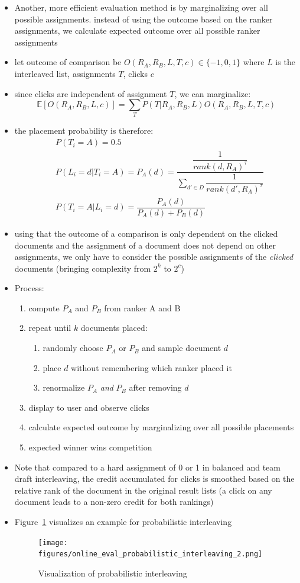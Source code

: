 \begin{itemize}
	\item Another, more efficient evaluation method is by marginalizing over all possible assignments. instead of using the outcome based on the ranker assignments, we calculate expected outcome over all possible ranker assignments
	\item let outcome of comparison be $O(R_A,R_B,L,T,c) \in \{-1,0,1\}$ where $L$ is the interleaved list, assignments $T$, clicks $c$
	\item since clicks are independent of assignment $T$, we can marginalize:
	$$ \mathbb{E}[O(R_A,R_B,L,c)] = \sum_T P(T|R_A,R_B,L)O(R_A,R_B,L,T,c)$$
	\item the placement probability is therefore:
	\begin{align*}
		&P(T_i=A) = 0.5 \\
		&P(L_i = d|T_i = A) = P_A(d) = \dfrac{\dfrac{1}{rank(d,R_A)^\tau}}{\sum_{d' \in D} \dfrac{1}{rank(d',R_A)^\tau}} \\
		&P(T_i = A|L_i=d) = \dfrac{P_A(d)}{P_A(d) + P_B(d)}
	\end{align*}
	\item using that the outcome of a comparison is only dependent on the clicked documents and the assignment of a document does not depend on other assignments, we only have to consider the possible assignments of the \textit{clicked} documents (bringing complexity from $2^k$ to $2^c$)
	\item Process:
	\begin{enumerate}
		\item compute $P_A$ and $P_B$ from ranker A and B
		\item repeat until $k$ documents placed:
		\begin{enumerate}
			\item randomly choose $P_A$ or $P_B$ and sample document $d$
			\item place $d$ without remembering which ranker placed it
			\item renormalize $P_A$ \textit{and} $P_B$ after removing $d$
		\end{enumerate}
		\item display to user and observe clicks
		\item calculate expected outcome by marginalizing over all possible placements
		\item expected winner wins competition
	\end{enumerate} 
	\item Note that compared to a hard assignment of 0 or 1 in balanced and team draft interleaving, the credit accumulated for clicks is smoothed based on the relative rank of the document in the original result lists (a click on any document leads to a non-zero credit for both rankings)
	\item Figure~\ref{img:online_eval_probabilistic_interleaving_2} visualizes an example for probabilistic interleaving
	\begin{figure}[ht]
		\centering
		\texttt{[image: figures/online\_eval\_probabilistic\_interleaving\_2.png]}
		\caption{Visualization of probabilistic interleaving}
		\label{img:online_eval_probabilistic_interleaving_2}
	\end{figure}
\end{itemize}
